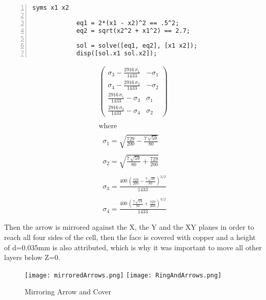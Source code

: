         \begin{lstlisting}[frame=single, numbers=left, style=Matlab-Pyglike]
            syms x1 x2

            eq1 = 2*(x1 - x2)^2 == .5^2;
            eq2 = sqrt(x2^2 + x1^2) == 2.7;

            sol = solve([eq1, eq2], [x1 x2]);
            disp([sol.x1 sol.x2]);  
        \end{lstlisting}
        
        \begin{equation}
            \label{eq:xysys}
            \displaystyle \begin{array}{l} 
                \left(\begin{array}{cc} 
                    \sigma_3 -\frac{2916\,\sigma_1 }{1433} & -\sigma_1 \\
                    \sigma_4 -\frac{2916\,\sigma_2 }{1433} & -\sigma_2 \\
                    \frac{2916\,\sigma_1 }{1433}-\sigma_3  & \sigma_1 \\
                    \frac{2916\,\sigma_2 }{1433}-\sigma_4  & \sigma_2  
                \end{array}\right)\\
                \mathrm{}\\
                \textrm{where}\\
                \mathrm{}\\
                \;\;\sigma_1 =\sqrt{\frac{729}{200}-\frac{7\,\sqrt{59}}{80}}\\
                \mathrm{}\\
                \;\;\sigma_2 =\sqrt{\frac{7\,\sqrt{59}}{80}+\frac{729}{200}}\\
                \mathrm{}\\
                \;\;\sigma_3 =\frac{400\,{{\left(\frac{729}{200}-\frac{7\,\sqrt{59}}{80}\right)}}^{3/2} }{1433}\\
                \mathrm{}\\
                \;\;\sigma_4 =\frac{400\,{{\left(\frac{7\,\sqrt{59}}{80}+\frac{729}{200}\right)}}^{3/2} }{1433}
            \end{array}
        \end{equation}

        Then the arrow is mirrored against the X, the Y and the XY planes in order to reach all four 
        sides of the cell, then the face is covered with copper and a height of d=0.035mm is also 
        attributed, which is why it was important to move all other layers below Z=0. 
        \begin{figure}[h]
            \centering
            \texttt{[image: mirroredArrows.png]}\hfil
            \texttt{[image: RingAndArrows.png]}
            \caption{Mirroring Arrow and Cover}
            \label{img:mirrorAndCover}
        \end{figure}

